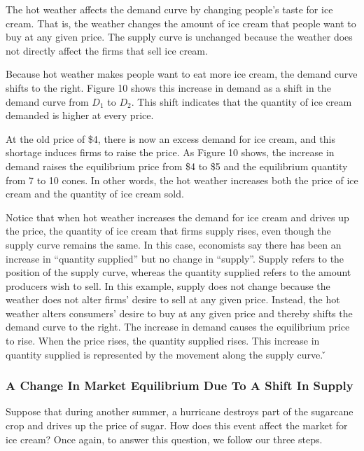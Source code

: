 \ben
\item The hot weather affects the demand curve by changing people's taste for ice cream. That is, the weather changes
the amount of ice cream that people want to buy at any given price. The supply curve is unchanged because the weather
does not directly affect the firms that sell ice cream.
\item Because hot weather makes people want to eat more ice cream, the demand curve shifts to the right. Figure 10
shows this increase in demand as a shift in the demand curve from $D_1$ to $D_2$. This shift indicates that the
quantity of ice cream demanded is higher at every price.
\item At the old price of \$4, there is now an excess demand for ice cream, and this shortage induces firms to raise
the price. As Figure 10 shows, the increase in demand raises the equilibrium price from \$4 to \$5 and the
equilibrium quantity from 7 to 10 cones. In other words, the hot weather increases both the price of ice cream and
the quantity of ice cream sold.
\een

Notice that when hot weather increases the demand for ice cream and drives up the price, the quantity of ice cream
that firms supply rises, even though the supply curve remains the same. In this case, economists say there has been
an increase in ``quantity supplied'' but no change in ``supply''. Supply refers to the position of the supply curve,
whereas the quantity supplied refers to the amount producers wish to sell. In this example, supply does not change
because the weather does not alter firms' desire to sell at any given price. Instead, the hot weather alters
consumers' desire to buy at any given price and thereby shifts the demand curve to the right. The increase in demand
causes the equilibrium price to rise. When the price rises, the quantity supplied rises. This increase in quantity
supplied is represented by the movement along the supply curve. \v

\subsubsection*{A Change In Market Equilibrium Due To A Shift In Supply}


Suppose that during another summer, a hurricane destroys part of the sugarcane crop and drives up the price of sugar.
How does this event affect the market for ice cream? Once again, to answer this question, we follow our three steps.

